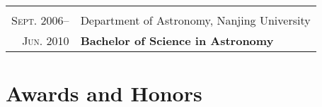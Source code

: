 \documentclass[letterpaper,12pt]{article}
\newcommand{\narrow}{-1.6ex}
\begin{document}
\begin{tabular}{r|p{5.25in}}
    \multicolumn{2}{c}{} \\[\narrow]
    \textsc{Sept. 2006}--     &   Department of Astronomy, Nanjing University \\
    \textsc{Jun. 2010}        &   \hfill\textbf{Bachelor of Science in Astronomy}
\end{tabular}


\section{Awards and Honors}
\end{document}
